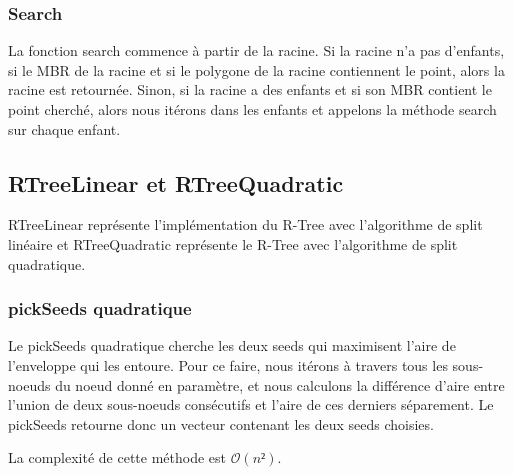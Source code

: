 \documentclass[utf8]{article}
\begin{document}
\begin{large}
    \par
    \subsubsection{Search}
    \par
    \indent
    La fonction search commence à partir de la racine. Si la racine n'a pas
    d'enfants, si le MBR de la racine et si le polygone de la racine contiennent
    le point, alors la racine est retournée. Sinon, si la racine a des enfants et
    si son MBR contient le point cherché, alors nous itérons dans les enfants et
    appelons la méthode search sur chaque enfant.

    \par
    \subsection{RTreeLinear et RTreeQuadratic}\label{RTreeLinear}
    \par
    \indent

    RTreeLinear représente l'implémentation du R-Tree avec l'algorithme de split
    linéaire et RTreeQuadratic représente le R-Tree avec l'algorithme de split quadratique.
    \par

    \subsubsection{pickSeeds quadratique}\label{PickSeeds quadratique}
    \par
    \indent
    Le pickSeeds quadratique cherche les deux seeds qui maximisent l'aire de l'enveloppe qui les entoure.
    Pour ce faire, nous itérons à travers tous les sous-noeuds du noeud donné en paramètre,
    et nous calculons la différence d'aire entre l'union de deux sous-noeuds consécutifs et l'aire de
    ces derniers séparement.
    Le pickSeeds retourne donc un vecteur contenant les deux seeds choisies.
    \par
    \indent
    La complexité de cette méthode est $\mathcal O(n²)$.
    \par

\end{large}
\end{document}
